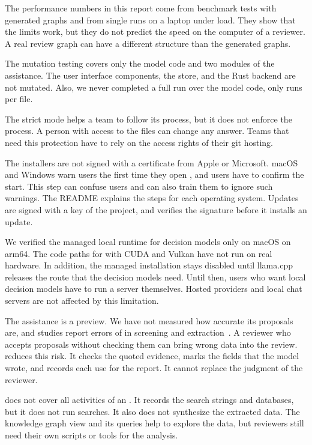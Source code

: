 The performance numbers in this report come from benchmark tests with generated graphs and from single runs on a laptop under load.
They show that the limits work, but they do not predict the speed on the computer of a reviewer.
A real review graph can have a different structure than the generated graphs.

The mutation testing covers only the model code and two modules of the \LLM assistance.
The user interface components, the store, and the Rust backend are not mutated.
Also, we never completed a full run over the model code, only runs per file.

The strict mode helps a team to follow its process, but it does not enforce the process.
A person with access to the files can change any answer.
Teams that need this protection have to rely on the access rights of their git hosting.

The installers are not signed with a certificate from Apple or Microsoft.
macOS and Windows warn users the first time they open \SaiLoR, and users have to confirm the start.
This step can confuse users and can also train them to ignore such warnings.
The README explains the steps for each operating system.
Updates are signed with a key of the project, and \SaiLoR verifies the signature before it installs an update.

We verified the managed local runtime for decision models only on macOS on arm64.
The code paths for \GPUs with CUDA and Vulkan have not run on real hardware.
In addition, the managed installation stays disabled until llama.cpp releases the route that the decision models need.
Until then, users who want local decision models have to run a server themselves.
Hosted providers and local chat servers are not affected by this limitation.

The \LLM assistance is a preview.
We have not measured how accurate its proposals are, and studies report errors of \LLMs in screening and extraction~\cite{felizardo2024chatgpt,khraisha2024llm}.
A reviewer who accepts proposals without checking them can bring wrong data into the review.
\SaiLoR reduces this risk.
It checks the quoted evidence, marks the fields that the model wrote, and records each use for the report.
It cannot replace the judgment of the reviewer.

\SaiLoR does not cover all activities of an \SLR.
It records the search strings and databases, but it does not run searches.
It also does not synthesize the extracted data.
The knowledge graph view and its queries help to explore the data, but reviewers still need their own scripts or tools for the analysis.

